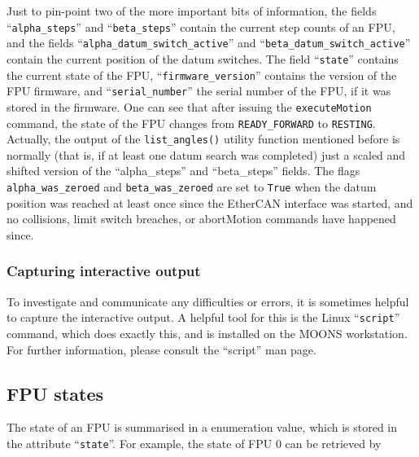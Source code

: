 \documentclass[11pt,a4paper]{scrartcl}
\begin{document}
\begin{sloppypar}
Just to pin-point two of the more important bits of information, the
fields ``\texttt{alpha\_steps}'' and ``\texttt{beta\_steps}'' contain
the current step counts of an FPU, and the fields
``\texttt{alpha\_datum\_switch\_active}'' and
``\texttt{beta\_datum\_switch\_active}'' contain the current position
of the datum switches. The field ``\texttt{state}'' contains the
current state of the FPU, ``\texttt{firmware\_version}'' contains the
version of the FPU firmware, and ``\texttt{serial\_number}'' the
serial number of the FPU, if it was stored in the firmware. One can
see that after issuing the \texttt{executeMotion} command, the state
of the FPU changes from \texttt{READY\_FORWARD} to
\texttt{RESTING}. Actually, the output of the \texttt{list\_angles()}
utility function mentioned before is normally (that is, if at least
one datum search was completed) just a scaled and shifted version of
the ``alpha\_steps'' and ``beta\_steps'' fields. The flags
\texttt{alpha\_was\_zeroed} and \texttt{beta\_was\_zeroed} are set to
\texttt{True} when the datum position was reached at least once since
the EtherCAN interface was started, and no collisions, limit switch breaches, or
abortMotion commands have happened since.
\end{sloppypar}

\subsubsection*{Capturing interactive output}
  To
investigate and communicate any difficulties or errors, it is
sometimes helpful to capture the interactive output. A helpful tool
for this is the Linux ``\texttt{script}'' command, which does exactly
this, and is installed on the MOONS workstation.  For further
information, please consult the ``script'' man page.



\subsection{FPU states}
  
 
 The state of an
FPU is summarised in a enumeration value, which is stored in the
attribute ``\texttt{state}''. For example, the state of FPU 0 can be
retrieved by
\end{document}
